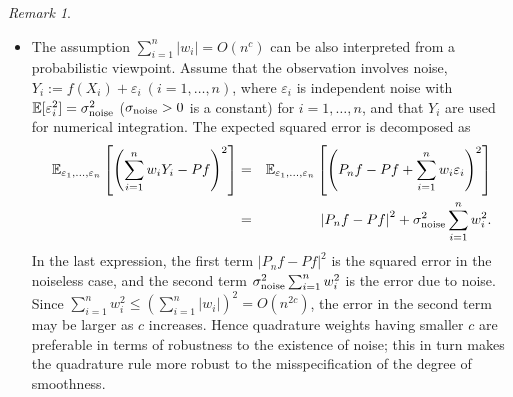 \documentclass[11pt]{article}
\theoremstyle{remark}
\newtheorem{remark}{Remark}
\theoremstyle{example}
\theoremstyle{remark}
\newcommand{\E}{{\mathbb{E}}}
\newcommand{\ve}{\varepsilon}
\begin{document}
\begin{remark}
\begin{itemize}
\item 
The assumption $\sum_{i=1}^n |w_i| = O(n^c)$ can be also interpreted from a probabilistic viewpoint.
Assume that the observation involves noise, $Y_i := f(X_i) + \varepsilon_i\ (i=1,\dots,n)$,  where $\ve_i$ is independent noise with $\E[ \ve_i^2] = \sigma_{\rm noise}^2$ ($\sigma_{\rm noise} > 0$ is a constant) for $i=1,\dots,n$, and that $Y_i$ are used for numerical integration.  
The expected squared error is decomposed as 
\begin{eqnarray*}
 \E_{\varepsilon_1,\dots,\varepsilon_n} \left[ \left( \sum_{i=1}^n w_i Y_i - Pf \right)^2  \right] 
&=&   \E_{\varepsilon_1,\dots,\varepsilon_n} \left[ \left( P_n f - Pf + \sum_{i=1}^n w_i \ve_i \right)^2  \right] \nonumber \\
&=&  \left| P_n f - Pf \right|^2 + \sigma_{\rm noise}^2 \sum_{i=1}^n w_i^2. %
\end{eqnarray*}
In the last expression, the first term $\left| P_n f - Pf \right|^2$ is the squared error in the noiseless case, and the second term $\sigma_{\rm noise}^2 \sum_{i=1}^n w_i^2 $ is the error due to noise.
Since $\sum_{i=1}^n w_i^2 \leq ( \sum_{i=1}^n |w_i| )^2 = O(n^{2c})$, the error in the second term may be larger as $c$ increases.
Hence quadrature weights having smaller $c$ are preferable in terms of robustness to the existence of noise; this in turn makes the quadrature rule more robust to the misspecification of the degree of smoothness.  
\begin{comment}
\item The assumption $\sum_{i=1}^n |w_i | = O(n^c)$ can be derived from a slightly stronger assumption that $\sum_{i=1}^n w_i^2  = O(n^{2c - 1})$.
This can be seen from an inequality $\sum_{i=1}^n |w_i| \leq n^{1/2} (\sum_{i=1}^n w_i^2)^{1/2} = O(n^c)$, which follows from the Cauchy-Schwartz. 
Assume that the quadrature weights satisfy this stronger assumption with $c < 1/2$, and consider again the above probabilistic interpretation. 
Then the second term in (\ref{eq:noise_output_277}) goes to $0$ as $n$ increases. 
\end{comment}
\end{itemize}
\end{remark}
\end{document}
